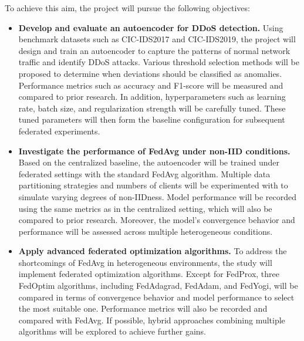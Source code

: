 To achieve this aim, the project will pursue the following objectives:

\begin{itemize}
    \item \textbf{Develop and evaluate an autoencoder for DDoS detection.} Using benchmark datasets such as CIC-IDS2017 and CIC-IDS2019, the project will design and train an autoencoder to capture the patterns of normal network traffic and identify DDoS attacks. Various threshold selection methods will be proposed to determine when deviations should be classified as anomalies. Performance metrics such as accuracy and F1-score will be measured and compared to prior research. In addition, hyperparameters such as learning rate, batch size, and regularization strength will be carefully tuned. These tuned parameters will then form the baseline configuration for subsequent federated experiments.
    \item \textbf{Investigate the performance of FedAvg under non-IID conditions.} Based on the centralized baseline, the autoencoder will be trained under federated settings with the standard FedAvg algorithm. Multiple data partitioning strategies and numbers of clients will be experimented with to simulate varying degrees of non-IIDness. Model performance will be recorded using the same metrics as in the centralized setting, which will also be compared to prior research. Moreover, the model's convergence behavior and performance will be assessed across multiple heterogeneous conditions.
    \item \textbf{Apply advanced federated optimization algorithms.} To address the shortcomings of FedAvg in heterogeneous environments, the study will implement federated optimization algorithms. Except for FedProx, three FedOptim algorithms, including FedAdagrad, FedAdam, and FedYogi, will be compared in terms of convergence behavior and model performance to select the most suitable one. Performance metrics will also be recorded and compared with FedAvg. If possible, hybrid approaches combining multiple algorithms will be explored to achieve further gains.
\end{itemize}

